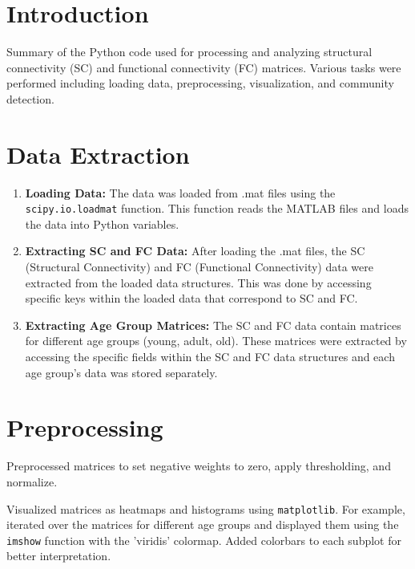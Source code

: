 
\section{Introduction}
Summary of the Python code used for processing and analyzing structural connectivity (SC) and functional connectivity (FC) matrices. Various tasks were performed including loading data, preprocessing, visualization, and community detection.

\section{Data Extraction}

\begin{enumerate}
    \item \textbf{Loading Data:} 
    The data was loaded from .mat files using the \texttt{scipy.io.loadmat} function. This function reads the MATLAB files and loads the data into Python variables.
    
    \item \textbf{Extracting SC and FC Data:} 
    After loading the .mat files, the SC (Structural Connectivity) and FC (Functional Connectivity) data were extracted from the loaded data structures. This was done by accessing specific keys within the loaded data that correspond to SC and FC.
    
    \item \textbf{Extracting Age Group Matrices:} 
    The SC and FC data contain matrices for different age groups (young, adult, old). These matrices were extracted by accessing the specific fields within the SC and FC data structures and each age group's data was stored separately.
\end{enumerate}


\section{Preprocessing}
Preprocessed matrices to set negative weights to zero, apply thresholding, and normalize.

Visualized matrices as heatmaps and histograms using \texttt{matplotlib}. For example, iterated over the matrices for different age groups and displayed them using the \texttt{imshow} function with the 'viridis' colormap. Added colorbars to each subplot for better interpretation.

